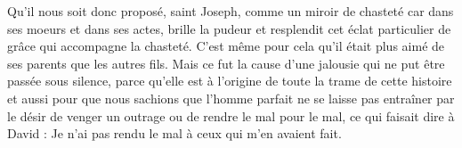  Qu'il nous soit donc proposé, saint Joseph, comme un miroir de chasteté car dans ses moeurs et dans ses actes, brille la pudeur et resplendit cet éclat particulier de grâce qui accompagne la chasteté. C’est même pour cela qu’il était plus aimé de ses parents que les autres fils. Mais ce fut la cause d’une jalousie qui ne put être passée sous silence, parce qu’elle est à l’origine de toute la trame de cette histoire et aussi pour que nous sachions que l’homme parfait ne se laisse pas entraîner par le désir de venger un outrage ou de rendre le mal pour le mal, ce qui faisait dire à David : Je n’ai pas rendu le mal à ceux qui m’en avaient fait.